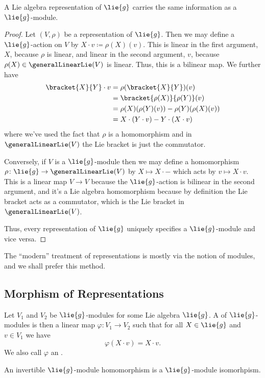 \documentclass[fleqn]{NotesClass}
\begin{document}
    \begin{prp}{}{}
        A Lie algebra representation of \(\lie{g}\) carries the same information as a \(\lie{g}\)-module.
        \begin{proof}
            Let \((V, \rho)\) be a representation of \(\lie{g}\).
            Then we may define a \(\lie{g}\)-action on \(V\) by \(X \cdot v \coloneqq \rho(X)(v)\).
            This is linear in the first argument, \(X\), because \(\rho\) is linear, and linear in the second argument, \(v\), because \(\rho(X) \in \generalLinearLie(V)\) is linear.
            Thus, this is a bilinear map.
            We further have
            \begin{align}
                \bracket{X}{Y} \cdot v &= \rho(\bracket{X}{Y})(v)\\
                &= \bracket{\rho(X)}{\rho(Y)}(v)\\
                &= \rho(X)(\rho(Y)(v)) - \rho(Y)(\rho(X)(v))\\
                &= X \cdot (Y \cdot v) - Y \cdot (X \cdot v)
            \end{align}
            where we've used the fact that \(\rho\) is a homomorphism and in \(\generalLinearLie(V)\) the Lie bracket is just the commutator.
            
            Conversely, if \(V\) is a \(\lie{g}\)-module then we may define a homomorphism \(\rho \colon \lie{g} \to \generalLinearLie(V)\) by \(X \mapsto X \cdot {-}\) which acts by \(v \mapsto X \cdot v\).
            This is a linear map \(V \to V\) because the \(\lie{g}\)-action is bilinear in the second argument, and it's a Lie algebra homomorphism because by definition the Lie bracket acts as a commutator, which is the Lie bracket in \(\generalLinearLie(V)\).
            
            Thus, every representation of \(\lie{g}\) uniquely specifies a \(\lie{g}\)-module and vice versa.
        \end{proof} 
    \end{prp}
    
    The \enquote{modern} treatment of representations is mostly via the notion of modules, and we shall prefer this method.
    
    \subsection{Morphism of Representations}
    \begin{dfn}{}{}
        Let \(V_1\) and \(V_2\) be \(\lie{g}\)-modules for some Lie algebra \(\lie{g}\).
        A  of \(\lie{g}\)-modules is then a linear map \(\varphi \colon V_1 \to V_2\) such that for all \(X \in \lie{g}\) and \(v \in V_1\) we have
        \begin{equation}
            \varphi(X \cdot v) = X \cdot v.
        \end{equation}
        We also call \(\varphi\) an .
        
        An invertible \(\lie{g}\)-module homomorphism is a \(\lie{g}\)-module isomorhpism.
    \end{dfn}
    
\end{document}
